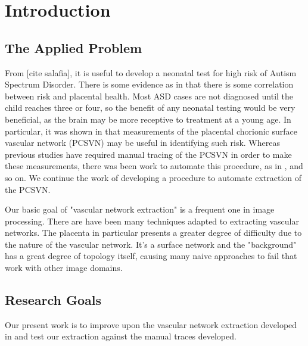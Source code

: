 
\chapter{Introduction}

	\section{The Applied Problem}
	From [cite salafia], it is useful to develop a neonatal test for high risk of Autism Spectrum Disorder. There is some evidence as in \cite{chang2016whole} that there is some correlation between risk and
	placental health. Most ASD cases are not diagnosed until the child reaches three or four, so the benefit of any neonatal testing would be very beneficial, as the brain may be more receptive to treatment at a young age. In particular, it was shown in \cite{chang2016whole} that measurements of the placental chorionic surface vascular network (PCSVN) may be useful in identifying such risk. Whereas previous studies have required manual tracing of the PCSVN in order to make these measurements, there was been work to automate this procedure, as in \cite{huynh2013filter} \cite{djima2017enhancing}, and so on. We continue the work of developing a procedure to automate extraction of the PCSVN.
	
		Our basic goal of "vascular network extraction" is a frequent one in image processing. There are have been many techniques adapted to extracting vascular networks. The placenta in particular presents a greater degree of difficulty due to the nature of the vascular network. It's a surface network and the "background" has a great degree of topology itself, causing many naive approaches to fail that work with other
		image domains.
		
		
	
	\section{Research Goals}
	Our present work is to improve upon the vascular network extraction
	developed in \cite{huynh2013filter} and test our extraction against the manual traces developed.